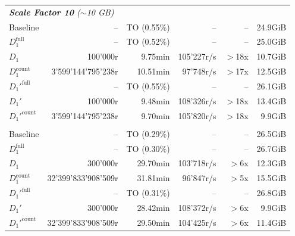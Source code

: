 \begin{longtable}{lrrrrr}
    \multicolumn{6}{l}{\textit{\textbf{Scale Factor 10} ($\sim$10 GB)}} \\
    \nopagebreak
    Baseline              &  --                   &  TO (0.55\%)         &  --                  & --                & 24.9GiB   \\
    $D_1^{\text{full}}$   &  --                   &  TO (0.52\%)         &  --                  & --                & 25.0GiB   \\
    \quad $D_1$           &  100'000r             &  9.75min             &  105'227r/s          & $>$18x            & 10.7GiB   \\
    $D_1^{\text{count}}$  &  3'599'144'795'238r   &  10.51min            &  97'748r/s           & $>$17x            & 12.5GiB   \\
    $D_1'^{\text{full}}$  &  --                   &  TO (0.55\%)         &  --                  & --                & 26.1GiB   \\
    \quad $D_1'$          &  100'000r             &  9.48min             &  108'326r/s          & $>$18x            & 13.4GiB   \\
    $D_1'^{\text{count}}$ &  3'599'144'795'238r   &  9.70min             &  105'820r/s          & $>$18x            & 9.9GiB    \\
    \addlinespace

    \multicolumn{6}{l}{\textit{\textbf{Scale Factor 30} ($\sim$30 GB)}} \\
    \nopagebreak
    Baseline              &  --                   &  TO (0.29\%)         &  --                  & --                & 26.5GiB   \\
    $D_1^{\text{full}}$   &  --                   &  TO (0.30\%)         &  --                  & --                & 26.7GiB   \\
    \quad $D_1$           &  300'000r             &  29.70min            &  103'718r/s          & $>$6x             & 12.3GiB   \\
    $D_1^{\text{count}}$  &  32'399'833'908'509r  &  31.81min            &  96'847r/s           & $>$5x             & 15.5GiB   \\
    $D_1'^{\text{full}}$  &  --                   &  TO (0.31\%)         &  --                  & --                & 26.8GiB   \\
    \quad $D_1'$          &  300'000r             &  28.42min            &  108'372r/s          & $>$6x             & 9.9GiB    \\
    $D_1'^{\text{count}}$ &  32'399'833'908'509r  &  29.50min            &  104'425r/s          & $>$6x             & 11.4GiB   \\
    \midrule


\end{longtable}
